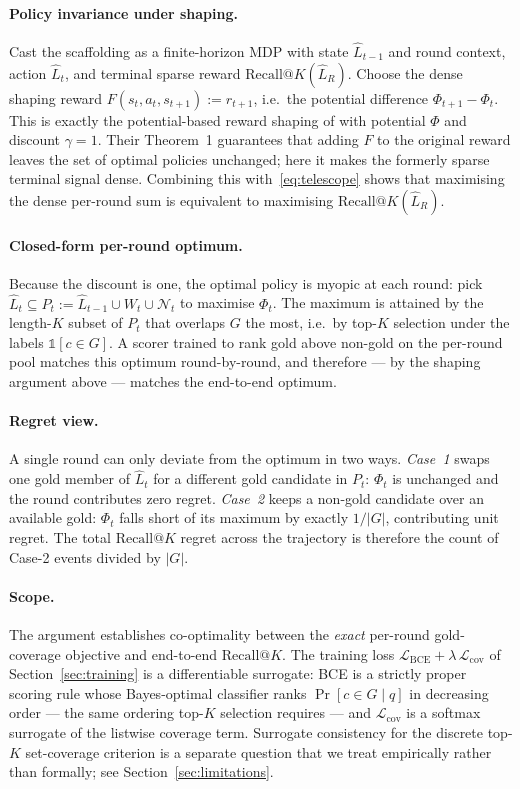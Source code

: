 \paragraph{Policy invariance under shaping.}
Cast the scaffolding as a finite-horizon MDP with state
$\hat{L}_{t-1}$ and round context, action $\hat{L}_t$, and
terminal sparse reward $\text{Recall}@K(\hat{L}_R)$. Choose the
dense shaping reward $F(s_t, a_t, s_{t+1}) := r_{t+1}$, i.e.\
the potential difference $\Phi_{t+1} - \Phi_t$. This is exactly
the potential-based reward shaping of \citet{ng1999policy} with
potential $\Phi$ and discount $\gamma = 1$. Their Theorem~1
guarantees that adding $F$ to the original reward leaves the
set of optimal policies unchanged; here it makes the formerly
sparse terminal signal dense. Combining this
with~\eqref{eq:telescope} shows that maximising the dense
per-round sum is equivalent to maximising
$\text{Recall}@K(\hat{L}_R)$.

\paragraph{Closed-form per-round optimum.}
Because the discount is one, the optimal policy is myopic at
each round: pick
$\hat{L}_t \subseteq P_t := \hat{L}_{t-1} \cup W_t \cup
\mathcal{N}_t$ to maximise $\Phi_t$. The maximum is attained by
the length-$K$ subset of $P_t$ that overlaps $G$ the most,
i.e.\ by top-$K$ selection under the labels $\mathbb{1}[c \in
G]$. A scorer trained to rank gold above non-gold on the
per-round pool matches this optimum round-by-round, and
therefore --- by the shaping argument above --- matches the
end-to-end optimum.

\paragraph{Regret view.}
A single round can only deviate from the optimum in two ways.
\emph{Case~1} swaps one gold member of $\hat{L}_t$ for a
different gold candidate in $P_t$: $\Phi_t$ is unchanged and
the round contributes zero regret. \emph{Case~2} keeps a
non-gold candidate over an available gold: $\Phi_t$ falls
short of its maximum by exactly $1/|G|$, contributing unit
regret. The total $\text{Recall}@K$ regret across the
trajectory is therefore the count of Case-2 events divided by
$|G|$.

\paragraph{Scope.}
The argument establishes co-optimality between the
\emph{exact} per-round gold-coverage objective and end-to-end
$\text{Recall}@K$. The training loss
$\mathcal{L}_{\text{BCE}} + \lambda\,\mathcal{L}_{\text{cov}}$
of Section~\ref{sec:training} is a differentiable surrogate: BCE
is a
strictly proper scoring rule whose Bayes-optimal classifier
ranks $\Pr[c \in G \mid q]$ in decreasing order --- the same
ordering top-$K$ selection requires --- and
$\mathcal{L}_{\text{cov}}$ is a softmax surrogate of the
listwise coverage term. Surrogate consistency for the discrete
top-$K$ set-coverage criterion is a separate question that we
treat empirically rather than formally; see
Section~\ref{sec:limitations}.

